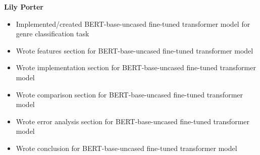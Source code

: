 \textbf{Lily Porter}
\begin{itemize}
\item Implemented/created BERT-base-uncased fine-tuned transformer model for genre classification task
\item Wrote features section for BERT-base-uncased fine-tuned transformer model
\item Wrote implementation section for BERT-base-uncased fine-tuned transformer model
\item Wrote comparison section for BERT-base-uncased fine-tuned transformer model
\item Wrote error analysis section for BERT-base-uncased fine-tuned transformer model
\item Wrote conclusion for BERT-base-uncased fine-tuned transformer model
\end{itemize}